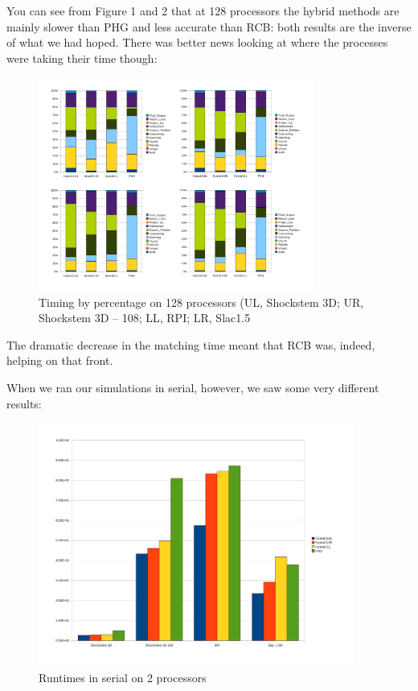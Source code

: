\documentclass[12pt]{article}
\begin{document}
You can see from Figure 1 and 2 that at 128 processors the hybrid methods
are mainly slower than PHG and less accurate than RCB: both results are
the inverse of what we had hoped. There was better news looking at where
the processes were taking their time though:

\begin{figure}[hgp]
  \centering
  \includegraphics[width=\textwidth, height=70mm]{128_breakdown_percent.pdf}
  \caption{Timing by percentage on 128 processors (UL, Shockstem 3D; UR,
  Shockstem 3D -- 108; LL, RPI; LR, Slac1.5}\label{fig:Percent_np_128}
\end{figure}

The dramatic decrease in the matching time meant that RCB was, indeed,
helping on that front.

When we ran our simulations in serial, however, we saw some very different
results:

\begin{figure}[hgp]
  \centering
  \includegraphics[width=\textwidth, height=80mm]{2_time.pdf}
  \caption{Runtimes in serial on 2 processors}\label{fig:Times_np_2}
\end{figure}
\end{document}
